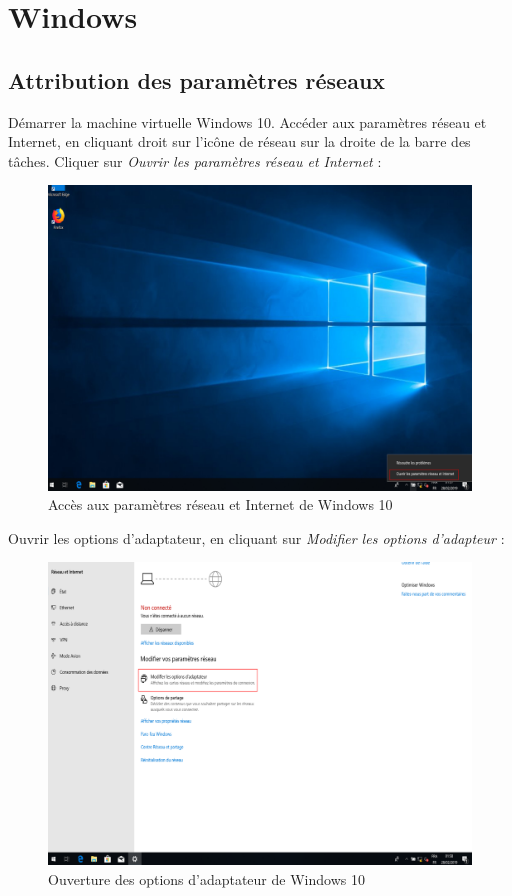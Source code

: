 \section{Windows}
\subsection{Attribution des paramètres réseaux}

Démarrer la machine virtuelle Windows 10. Accéder aux paramètres réseau et Internet, en cliquant droit sur l'icône de réseau sur la droite de la barre des tâches. Cliquer sur \textit{Ouvrir les paramètres réseau et Internet} :
\begin{figure}[h!]
	\begin{center}
		\includegraphics[scale=0.6]{W_Screenshots/41.png}
		\caption{Accès aux paramètres réseau et Internet de Windows 10}
		\label{W_Screenshots/41}
	\end{center}
\end{figure}
\FloatBarrier

\newpage
Ouvrir les options d'adaptateur, en cliquant sur \textit{Modifier les options d'adapteur} :
\begin{figure}[h!]
	\begin{center}
		\includegraphics[scale=0.6]{W_Screenshots/42.png}
		\caption{Ouverture des options d'adaptateur de Windows 10}
		\label{W_Screenshots/42}
	\end{center}
\end{figure}
\FloatBarrier

